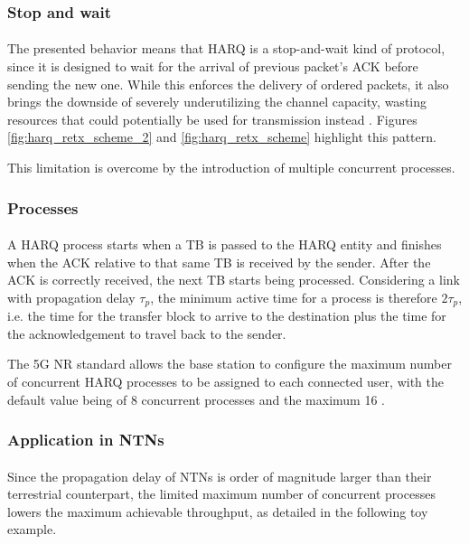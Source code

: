 \subsubsection{Stop and wait}
\paragraph{} The presented behavior means that \ac{HARQ} is a stop-and-wait kind of protocol, since it is designed to wait for the arrival of previous packet's \ac{ACK} before sending the new one. While this enforces the delivery of ordered packets, it also brings the downside of severely underutilizing the channel capacity, wasting resources that could potentially be used for transmission instead \cite{3gpp-ts-38.214}. Figures \ref{fig:harq_retx_scheme_2} and \ref{fig:harq_retx_scheme} highlight this pattern.

This limitation is overcome by the introduction of multiple concurrent processes.

\subsubsection{Processes}
\paragraph{}
A \ac{HARQ} process starts when a \ac{TB} is passed to the \ac{HARQ} entity and finishes when the \ac{ACK} relative to that same \ac{TB} is received by the sender. After the \ac{ACK} is correctly received, the next \ac{TB} starts being processed. Considering a link with propagation delay $\tau_p$, the minimum active time for a process is therefore $2\tau_p$, i.e. the time for the transfer block to arrive to the destination plus the time for the acknowledgement to travel back to the sender.

The 5G \ac{NR} standard allows the base station to configure the maximum number of concurrent \ac{HARQ} processes to be assigned to each connected user, with the default value being of 8 concurrent processes and the maximum 16 \cite{3gpp-ts-38.300, 5g-nr-harq-devopedia}. 

\subsubsection{Application in NTNs}
\paragraph{}
Since the propagation delay of \ac{NTNs} is order of magnitude larger than their terrestrial counterpart, the limited maximum number of concurrent processes lowers the maximum achievable throughput, as detailed in the following toy example. 


